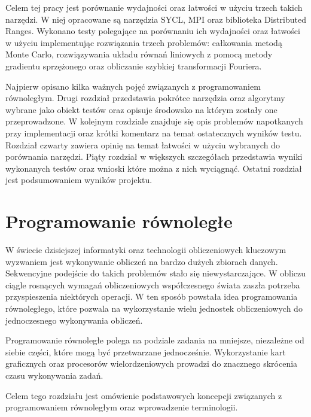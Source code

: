 \documentclass[a4paper,12pt]{book} %
\begin{document}
Celem tej pracy jest porównanie wydajności oraz łatwości w użyciu trzech takich narzędzi. W niej opracowane są narzędzia SYCL, MPI oraz biblioteka Distributed Ranges. Wykonano testy polegające na porównaniu ich wydajności oraz łatwości w użyciu implementując rozwiązania trzech problemów: całkowania metodą Monte Carlo, rozwiązywania układu równań liniowych z pomocą metody gradientu sprzężonego oraz obliczanie szybkiej transformacji Fouriera. 

Najpierw opisano kilka ważnych pojęć związanych z programowaniem równoległym. Drugi rozdział przedstawia pokrótce narzędzia oraz algorytmy wybrane jako obiekt testów oraz opisuje środowsko na którym zostały one przeprowadzone. W kolejnym rozdziale znajduje się opis problemów napotkanych przy implementacji oraz krótki komentarz na temat ostatecznych wyników testu. Rozdział czwarty zawiera opinię na temat łatwości w użyciu wybranych do porównania narzędzi. Piąty rozdział w większych szczegółach przedstawia wyniki wykonanych testów oraz wnioski które można z nich wyciągnąć. Ostatni rozdział jest podsumowaniem wyników projektu.

\chapter{Programowanie równoległe}
W świecie dzisiejszej informatyki oraz technologii obliczeniowych kluczowym wyzwaniem jest wykonywanie obliczeń na bardzo dużych zbiorach danych. Sekwencyjne podejście do takich problemów stało się niewystarczające. W obliczu ciągle rosnących wymagań obliczeniowych współczesnego świata zaszła potrzeba przyspieszenia niektórych operacji. W ten sposób powstała idea programowania równoległego, które pozwala na wykorzystanie wielu jednostek obliczeniowych do jednoczesnego wykonywania obliczeń.

Programowanie równoległe polega na podziale zadania na mniejsze, niezależne od siebie części, które mogą być przetwarzane jednocześnie. Wykorzystanie kart graficznych oraz procesorów wielordzeniowych prowadzi do znacznego skrócenia czasu wykonywania zadań.

Celem tego rozdziału jest omówienie podstawowych koncepcji związanych z programowaniem równoległym oraz wprowadzenie terminologii.
\end{document}
